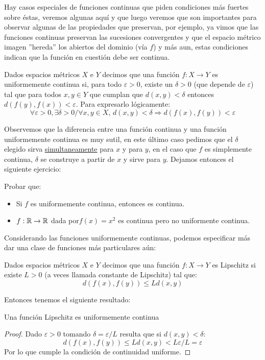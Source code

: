 \documentclass[12pt,a4paper]{book}
\begin{document}
Hay casos especiales de funciones continuas que piden condiciones más fuertes sobre éstas, veremos algunas aquí y que luego veremos que son importantes para observar algunas de las propiedades que preservan, por ejemplo, ya vimos que las funciones continuas preservan las sucesiones convergentes y que el espacio métrico imagen ''hereda'' los abiertos del dominio (vía $f$) y más aun, estas condiciones indican que la función en cuestión debe ser continua.
\begin{defi}
Dados espacios métricos $X$ e $Y$ decimos que una función $f:X \rightarrow Y$ es uniformemente continua si, para todo $\varepsilon > 0$, existe un $\delta > 0$ (que depende de $\varepsilon$) tal que para todos $x,y \in Y$ que cumplan que $d(x,y)<\delta$ entonces $d(f(y),f(x))<\varepsilon$. Para expresarlo lógicamente:
$$ \forall \varepsilon>0, \exists \delta>0 \slash \forall x,y \in X,\, d(x,y)<\delta \Rightarrow d(f(x),f(y))<\varepsilon$$
\end{defi}
Observemos que la diferencia entre una función continua y una función uniformemente continua es muy sutil, en este último caso pedimos que el $\delta$ elegido sirva \underline{simultaneamente} para $x$ y para $y$, en el caso que $f$ es simplemente continua, $\delta$ se construye a partir de $x$ y sirve para $y$. Dejamos entonces el siguiente ejercicio:
\begin{ej} Probar que:
\begin{itemize}
\item Si $f$ es uniformemente continua, entonces es continua.
\item $f:\mathbb{R} \rightarrow \mathbb{R}$ dada por$f(x)=x^2$ es continua pero no uniformente continua.
\end{itemize}
\end{ej}
Considerando las funciones uniformemente continuas, podemos especificar más dar una clase de funciones más particulares aún:
\begin{defi}
Dados espacios métricos $X$ e $Y$ decimos que una función $f:X \rightarrow Y$ es Lipschitz si existe $L>0$ (a veces llamada constante de Lipschitz) tal que:
$$ d(f(x),f(y)) \leq L d(x,y)$$
\end{defi}
Entonces tenemos el siguiente resultado:
\begin{prop} Una función Lipschitz es uniformemente continua
\begin{proof}
Dado $\varepsilon>0$ tomando $\delta = \varepsilon/L$ resulta que si $d(x,y)< \delta$:
$$ d(f(x),f(y)) \leq L d(x,y) < L \varepsilon/L= \varepsilon$$
Por lo que cumple la condición de continuidad uniforme.
\end{proof}
\end{prop}
\end{document}
